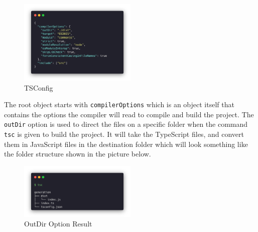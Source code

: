 \begin{figure}[H]
  \centering
  \includegraphics[width=0.5\textwidth]{figures/code/tsconfig.png}
  \caption{TSConfig}
  \label{f:ch5-refactored-tsconfig}
\end{figure}

The root object starts with \texttt{compilerOptions} which is an object itself
that contains the options the compiler will read to compile and build the project.
The \texttt{outDir} option is used to direct the files on a specific folder when
the command \texttt{tsc} is given to build the project. It will take the
TypeScript files, and convert them in JavaScript files in the destination folder
which will look something like the folder structure shown in the picture below.

\begin{figure}[H]
  \centering
  \includegraphics[width=0.5\textwidth]{figures/code/outdir.png}
  \caption{OutDir Option Result}
  \label{f:ch5-refactored-outdir}
\end{figure}

